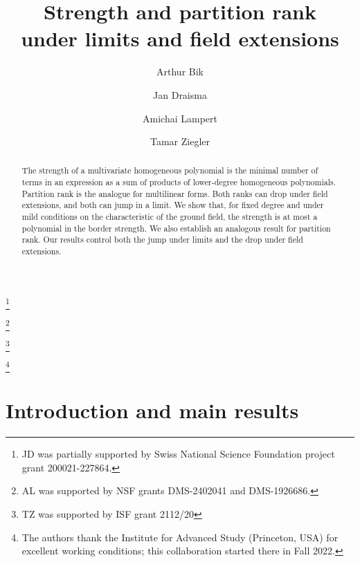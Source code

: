 \documentclass{amsart}
\begin{document}
\title[Strength and partition rank]{Strength and partition rank\\ under limits and field extensions}

\author[Bik]{Arthur Bik}
\address{D.E.~Shaw \& Co., Floor 52, Two Manhattan West, 375 Ninth
Avenue New York, 10001 NY, USA}

\author[Draisma]{Jan Draisma}
\address{Mathematical Institute, University of Bern, Sidlerstrasse 5, 3012 Bern, Switzerland; and Department of Mathematics and Computer Science, Eindhoven University of Technology, P.O. Box 513, 5600MB, Eindhoven, the Netherlands}
\thanks{JD was partially supported by Swiss National Science
Foundation project grant 200021-227864.}

\author[Lampert]{Amichai Lampert}
\address{Mathematics Department, University of Michigan, 530 Church Street, Ann Arbor, MI 48109-1043, USA}
\thanks{AL was supported by NSF grants DMS-2402041 and DMS-1926686.}

\author[Ziegler]{Tamar Ziegler}
\address{Einstein Institute of Mathematics,
Edmond J. Safra Campus, 
The Hebrew University of Jerusalem,
Givat Ram. Jerusalem, 9190401, Israel}
\thanks{TZ was supported by ISF grant 2112/20}

\thanks{The authors thank the Institute for Advanced Study (Princeton,
USA) for excellent working conditions; this collaboration started
there in Fall 2022.}

\begin{abstract}
The strength of a multivariate homogeneous polynomial is the minimal
number of terms in an expression as a sum of products of lower-degree
homogeneous polynomials. Partition rank is the analogue for multilinear
forms. Both ranks can drop under field extensions, and both can jump in
a limit. We show that, for fixed degree and under mild conditions on
the characteristic of the ground field, the strength is at
most a polynomial in the border strength. We also establish an analogous
result for partition rank. Our results control both the jump under limits and
the drop under field extensions.
\end{abstract}

\maketitle

\section{Introduction and main results}
\end{document}
